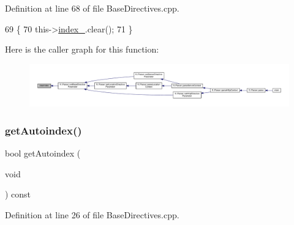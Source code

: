 Definition at line 68 of file Base\+Directives.\+cpp.


\begin{DoxyCode}
69     \{
70         this->\hyperlink{classft_1_1_base_directives_a6ba30626837f300201cd32c35d50aa49}{index\_}.clear();
71     \}
\end{DoxyCode}
Here is the caller graph for this function\+:
\nopagebreak
\begin{figure}[H]
\begin{center}
\leavevmode
\includegraphics[width=350pt]{classft_1_1_base_directives_a36d96dc74e650162c25a325813130ab2_icgraph}
\end{center}
\end{figure}
\mbox{\label{classft_1_1_base_directives_a4c11ed7ad76aeac228b029a2444de568}} 
\subsubsection{\texorpdfstring{get\+Autoindex()}{getAutoindex()}}
{\footnotesize\ttfamily bool get\+Autoindex (\begin{DoxyParamCaption}\item[{void}]{ }\end{DoxyParamCaption}) const}



Definition at line 26 of file Base\+Directives.\+cpp.


